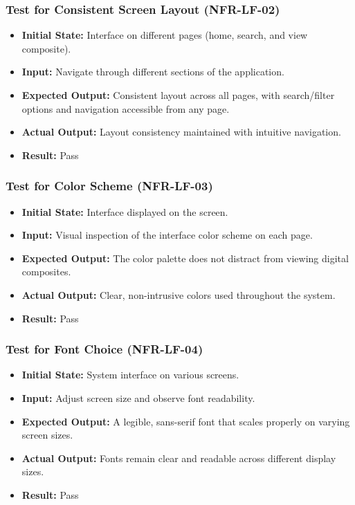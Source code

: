 \documentclass[12pt, titlepage]{article}
\begin{document}
\subsubsection{Test for Consistent Screen Layout (NFR-LF-02)}
\begin{itemize}
    \item \textbf{Initial State: }Interface on different pages (home, search, and view composite).
    \item \textbf{Input: }Navigate through different sections of the application.
    \item \textbf{Expected Output: }Consistent layout across all pages, with search/filter options and navigation accessible from any page.
    \item \textbf{Actual Output: }Layout consistency maintained with intuitive navigation.
    \item \textbf{Result: }Pass
\end{itemize}

\subsubsection{Test for Color Scheme (NFR-LF-03)}
\begin{itemize}
    \item \textbf{Initial State: }Interface displayed on the screen.
    \item \textbf{Input: }Visual inspection of the interface color scheme on each page.
    \item \textbf{Expected Output: }The color palette does not distract from viewing digital composites.
    \item \textbf{Actual Output: }Clear, non-intrusive colors used throughout the system.
    \item \textbf{Result: }Pass
\end{itemize}

\subsubsection{Test for Font Choice (NFR-LF-04)}
\begin{itemize}
    \item \textbf{Initial State: }System interface on various screens.
    \item \textbf{Input: }Adjust screen size and observe font readability.
    \item \textbf{Expected Output: }A legible, sans-serif font that scales properly on varying screen sizes.
    \item \textbf{Actual Output: }Fonts remain clear and readable across different display sizes.
    \item \textbf{Result: }Pass
\end{itemize}
\end{document}
